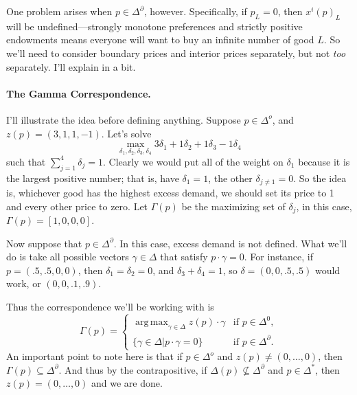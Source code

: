 \documentclass[12pt]{article}
\DeclareMathOperator*{\argmax}{arg\,max}
\theoremstyle{definition}
\begin{document}
One problem arises when $p \in \Delta^{\partial}$, however. Specifically, if $p_L=0$, then $x^i(p)_L$ will be undefined---strongly monotone preferences and strictly positive endowments means everyone will want to buy an infinite number of good $L$. So we'll need to consider boundary prices and interior prices separately, but not \emph{too} separately. I'll explain in a bit. 


\paragraph{The Gamma Correspondence.} I'll illustrate the idea before defining anything. Suppose $p \in \Delta^o$, and  $z(p)=(3, 1, 1, -1)$. Let's solve
	\[	\max_{\delta_1, \delta_2, \delta_3, \delta_4} 3\delta_1 + 1 \delta_2 + 1 \delta_3 - 1 \delta_4\]
	such that $\sum_{j=1}^4 \delta_j=1$. Clearly we would put all of the weight on $\delta_1$ because it is the largest positive number; that is, have $\delta_1=1$, the other $\delta_{j \neq 1}  = 0$. So the idea is, whichever good has the highest excess demand, we should set its price to 1 and every other price to zero. Let $\Gamma(p)$ be the maximizing set of $\delta_j$, in this case, $\Gamma(p)=[1,0,0,0]$. 

Now suppose that  $p \in \Delta^{\partial}$. In this case, excess demand is not defined. What we'll do is take all possible vectors  $\gamma \in \Delta$ that satisfy $p \cdot \gamma =0$. For instance, if $p=( .5, .5, 0, 0)$, then $\delta_1=\delta_2=0$, and $\delta_3+\delta_4 = 1$, so $\delta = (0, 0, .5, .5)$ would work, or $(0, 0, .1, .9)$. 

Thus the correspondence we'll be working with is
\[
	\Gamma(p) = 
	\begin{cases}
		\argmax_{\gamma \in \Delta} z(p) \cdot \gamma &\text{if } p \in \Delta^0,\\
		\{\gamma \in \Delta | p \cdot \gamma =0\} &\text{if } p \in \Delta^{\partial}.
	\end{cases}
\]
An important point to note here is that if $p \in \Delta^o$ and $z(p) \neq (0, \hdots, 0)$, then $\Gamma(p) \subseteq \Delta^{\partial}$. And thus by the contrapositive, if $\Delta(p) \not\subseteq \Delta^{\partial}$ and $p \in \Delta^*$, then $z(p)=(0, \hdots, 0)$ and we are done. 
\end{document}
